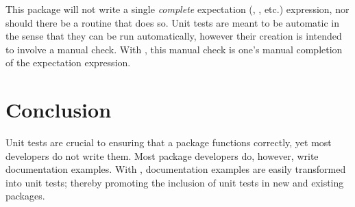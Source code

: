 This package will not write a single \emph{complete} expectation (,  , etc.) expression, nor should there be a routine that does so. Unit tests are meant to be automatic in the sense that they can be run automatically, however their creation is intended to involve a manual check. With , this manual check is one's manual completion of the expectation expression.

\section{Conclusion}
Unit tests are crucial to ensuring that a package functions correctly, yet most developers do not write them. Most package developers do, however, write documentation examples. With , documentation examples are easily transformed into unit tests; thereby promoting the inclusion of unit tests in new and existing packages.



\address{Rory Nolan\\
  Wellcome Trust Centre for Human Genetics, University of Oxford\\
  OX3 7BN\\
  United Kingdom\\}

\address{Sergi Padilla-Parra\\
  Wellcome Trust Centre for Human Genetics and Division of Structural Biology, University of Oxford\\
  OX3 7BN\\
  United Kingdom\\}
